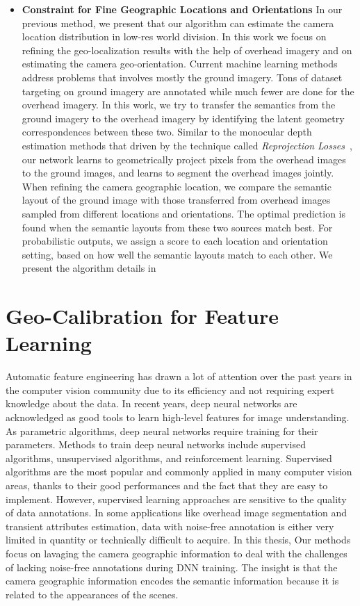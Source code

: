 \begin{itemize}[noitemsep]
  \item \textbf{Constraint for Fine Geographic Locations and Orientations}
  In our previous method, we present that our algorithm can estimate
  the camera location distribution in low-res world division. In this
  work we focus on refining the geo-localization results with the help
  of overhead imagery and on estimating the camera geo-orientation.
  Current machine learning methods address problems that involves mostly
  the ground imagery. Tons of dataset targeting on ground imagery are
  annotated while much fewer are done for the overhead imagery.
  In this work, we try to transfer the semantics from the ground imagery
  to the overhead imagery by identifying the latent geometry
  correspondences between these two. Similar to the monocular depth
  estimation methods that driven by
  the technique called {\em Reprojection
  Losses}~\cite{garg2016unsupervised,
  godard2017unsupervised,zhou2017unsupervised, yan2016perspective}, our
  network learns to geometrically project pixels from the overhead
  images to the ground images,
  and learns to segment the overhead images jointly. 
  When refining the camera geographic location, we compare the
  semantic layout of the ground image with those transferred from
  overhead images sampled from different locations and orientations. The
  optimal prediction is found when the semantic layouts from these
  two sources match best. For probabilistic outputs, we assign
  a score to each location and orientation setting,
  based on how well the semantic layouts match to each other.
  We present the algorithm details in 
  \newline

\end{itemize}


\section{Geo-Calibration for Feature Learning}

Automatic feature engineering has drawn a lot of attention over the
past years in the computer vision community due to its efficiency and
not requiring expert knowledge about the data.  In recent years, deep
neural networks are acknowledged as good tools to learn high-level
features for image understanding.  As parametric algorithms, deep
neural networks require training for their parameters.  Methods to
train deep neural networks include supervised algorithms, unsupervised
algorithms, and reinforcement learning. Supervised algorithms are the
most popular and commonly applied in many computer vision areas,
thanks to their good performances and the fact that they are easy to
implement. However, supervised learning approaches are sensitive to
the quality of data annotations. In some applications like overhead
image segmentation and transient attributes estimation, data with
noise-free annotation is either very limited in quantity or
technically difficult to acquire.  In this thesis, Our methods focus
on lavaging the camera geographic information to deal with the
challenges of lacking noise-free annotations during DNN training. The
insight is that the camera geographic information encodes the semantic
information because it is related to the appearances of the scenes.
